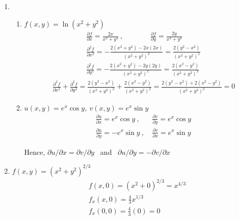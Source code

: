 \documentclass[12pt]{amsart}
\begin{document}
\begin{enumerate}
			\bigskip
			
	\item
	
		\begin{enumerate}
		
			\item $f(x,y)=\ln(x^2+y^2)$
				\begin{align*}
					&\frac{\partial f}{\partial x}=\frac{2x}{x^2+y^2} \ , \ \ \ \ \ \ \ \ \ \ \ \ \ \ \ \ \ \frac{\partial f}{\partial y}=\frac{2y}{x^2+y^2} \\
					&\frac{\partial^2 f}{\partial x^2}=-\frac{2(x^2+y^2)-2x(2x)}{(x^2+y^2)^2}=\frac{2(y^2-x^2)}{(x^2+y^2)^2} \\
					&\frac{\partial^2 f}{\partial y^2}=-\frac{2(x^2+y^2)-2y(2y)}{(x^2+y^2)^2}=\frac{2(x^2-y^2)}{(x^2+y^2)^2}
				\end{align*}
				\begin{align*}
					\ \ \ \ \frac{\partial^2 f}{\partial x^2}+\frac{\partial^2 f}{\partial y^2}=\frac{2(y^2-x^2)}{(x^2+y^2)^2}+\frac{2(x^2-y^2)}{(x^2+y^2)^2}=\frac{2(y^2-x^2)+2(x^2-y^2)}{(x^2+y^2)^2}=0
				\end{align*}
				
				\bigskip
									
			\item $u(x,y)=e^x\cos y, \ v(x,y)=e^x\sin y$ 
				\begin{align*}
					&\frac{\partial u}{\partial x}=e^x \cos y \ , \ &\frac{\partial v}{\partial y}=e^x \cos y \\
					&\frac{\partial u}{\partial y}=-e^x \sin y \ , \ &\frac{\partial v}{\partial x}=e^x \sin y
				\end{align*}
				
				\medskip 
				
			Hence, $\partial u/\partial x = \partial v/\partial y$ \ and \ $\partial u/\partial y = -\partial v/\partial x$
			
				\bigskip
			
		\end{enumerate}	
				
	\item $f(x,y)=(x^2+y^2)^{2/3}$
		\begin{align*}
			&f(x,0)=(x^2+0)^{2/3}=x^{4/3} \\
			&f_x(x,0)=\frac{4}{3}x^{1/3} \\
			&f_x(0,0)=\frac{4}{3}(0)=0
		\end{align*}
				
\end{enumerate}
\end{document}
